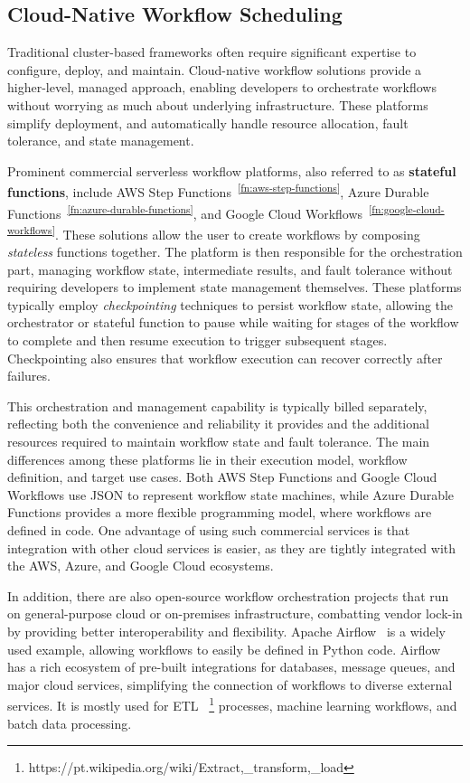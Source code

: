 \documentclass[conference]{IEEEtran}
\begin{document}
\subsection{Cloud-Native Workflow Scheduling}
Traditional cluster-based frameworks often require significant expertise to configure, deploy, and maintain. Cloud-native workflow solutions provide a higher-level, managed approach, enabling developers to orchestrate workflows without worrying as much about underlying infrastructure. These platforms simplify deployment, and automatically handle resource allocation, fault tolerance, and state management.

Prominent commercial serverless workflow platforms, also referred to as \textbf{stateful functions}, include AWS Step Functions~\textsuperscript{\ref{fn:aws-step-functions}}, Azure Durable Functions~\textsuperscript{\ref{fn:azure-durable-functions}}, and Google Cloud Workflows~\textsuperscript{\ref{fn:google-cloud-workflows}}. These solutions allow the user to create workflows by composing \textit{stateless} functions together. The platform is then responsible for the orchestration part, managing workflow state, intermediate results, and fault tolerance without requiring developers to implement state management themselves. These platforms typically employ \textit{checkpointing} techniques to persist workflow state, allowing the orchestrator or stateful function to pause while waiting for stages of the workflow to complete and then resume execution to trigger subsequent stages. Checkpointing also ensures that workflow execution can recover correctly after failures.

This orchestration and management capability is typically billed separately, reflecting both the convenience and reliability it provides and the additional resources required to maintain workflow state and fault tolerance. The main differences among these platforms lie in their execution model, workflow definition, and target use cases. Both AWS Step Functions and Google Cloud Workflows use JSON to represent workflow state machines, while Azure Durable Functions provides a more flexible programming model, where workflows are defined in code. One advantage of using such commercial services is that integration with other cloud services is easier, as they are tightly integrated with the AWS, Azure, and Google Cloud ecosystems.

In addition, there are also open-source workflow orchestration projects that run on general-purpose cloud or on-premises infrastructure, combatting vendor lock-in by providing better interoperability and flexibility. Apache Airflow~\cite{apache_airflow} is a widely used example, allowing workflows to easily be defined in Python code. Airflow has a rich ecosystem of pre-built integrations for databases, message queues, and major cloud services, simplifying the connection of workflows to diverse external services. It is mostly used for ETL ~\footnote{\label{fn:etl}https://pt.wikipedia.org/wiki/Extract,\_transform,\_load} processes, machine learning workflows, and batch data processing.
\end{document}
